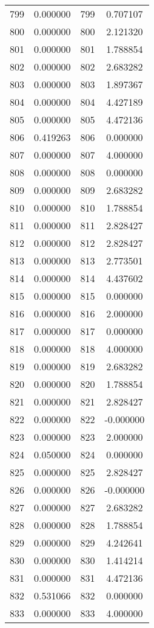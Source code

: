 \documentclass[12pt]{article}
\begin{document}
\begin{longtable}{@{}cccc@{}}
799 & 0.000000 & 799 & 0.707107 \\
800 & 0.000000 & 800 & 2.121320 \\
801 & 0.000000 & 801 & 1.788854 \\
802 & 0.000000 & 802 & 2.683282 \\
803 & 0.000000 & 803 & 1.897367 \\
804 & 0.000000 & 804 & 4.427189 \\
805 & 0.000000 & 805 & 4.472136 \\
806 & 0.419263 & 806 & 0.000000 \\
807 & 0.000000 & 807 & 4.000000 \\
808 & 0.000000 & 808 & 0.000000 \\
809 & 0.000000 & 809 & 2.683282 \\
810 & 0.000000 & 810 & 1.788854 \\
811 & 0.000000 & 811 & 2.828427 \\
812 & 0.000000 & 812 & 2.828427 \\
813 & 0.000000 & 813 & 2.773501 \\
814 & 0.000000 & 814 & 4.437602 \\
815 & 0.000000 & 815 & 0.000000 \\
816 & 0.000000 & 816 & 2.000000 \\
817 & 0.000000 & 817 & 0.000000 \\
818 & 0.000000 & 818 & 4.000000 \\
819 & 0.000000 & 819 & 2.683282 \\
820 & 0.000000 & 820 & 1.788854 \\
821 & 0.000000 & 821 & 2.828427 \\
822 & 0.000000 & 822 & -0.000000 \\
823 & 0.000000 & 823 & 2.000000 \\
824 & 0.050000 & 824 & 0.000000 \\
825 & 0.000000 & 825 & 2.828427 \\
826 & 0.000000 & 826 & -0.000000 \\
827 & 0.000000 & 827 & 2.683282 \\
828 & 0.000000 & 828 & 1.788854 \\
829 & 0.000000 & 829 & 4.242641 \\
830 & 0.000000 & 830 & 1.414214 \\
831 & 0.000000 & 831 & 4.472136 \\
832 & 0.531066 & 832 & 0.000000 \\
833 & 0.000000 & 833 & 4.000000 \\

\end{longtable}
\end{document}
